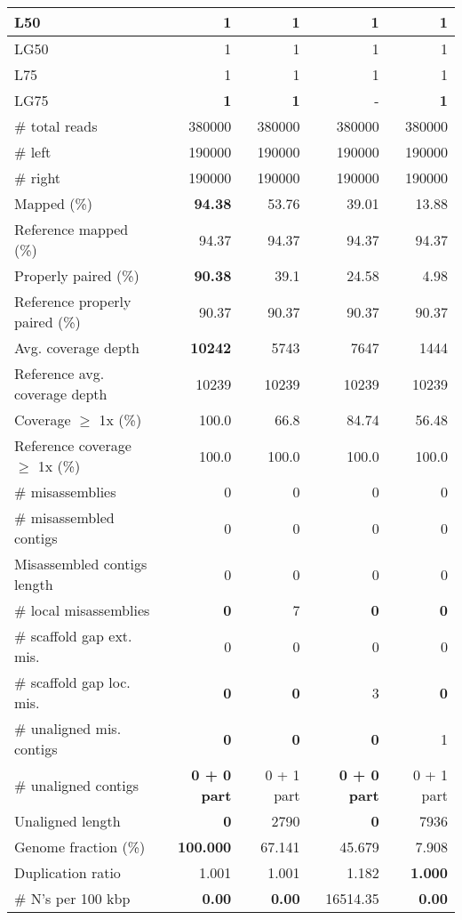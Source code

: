 \documentclass[12pt,a4paper]{article}
\begin{document}
\begin{table}[ht]
\begin{center}
\begin{tabular}{|l*{4}{|r}|}
L50 & 1 & 1 & 1 & 1 \\ \hline
LG50 & 1 & 1 & 1 & 1 \\ \hline
L75 & 1 & 1 & 1 & 1 \\ \hline
LG75 & {\bf 1} & {\bf 1} & - & {\bf 1} \\ \hline
\# total reads & 380000 & 380000 & 380000 & 380000 \\ \hline
\# left & 190000 & 190000 & 190000 & 190000 \\ \hline
\# right & 190000 & 190000 & 190000 & 190000 \\ \hline
Mapped (\%) & {\bf 94.38} & 53.76 & 39.01 & 13.88 \\ \hline
Reference mapped (\%) & 94.37 & 94.37 & 94.37 & 94.37 \\ \hline
Properly paired (\%) & {\bf 90.38} & 39.1 & 24.58 & 4.98 \\ \hline
Reference properly paired (\%) & 90.37 & 90.37 & 90.37 & 90.37 \\ \hline
Avg. coverage depth & {\bf 10242} & 5743 & 7647 & 1444 \\ \hline
Reference avg. coverage depth & 10239 & 10239 & 10239 & 10239 \\ \hline
Coverage $\geq$ 1x (\%) & 100.0 & 66.8 & 84.74 & 56.48 \\ \hline
Reference coverage $\geq$ 1x (\%) & 100.0 & 100.0 & 100.0 & 100.0 \\ \hline
\# misassemblies & 0 & 0 & 0 & 0 \\ \hline
\# misassembled contigs & 0 & 0 & 0 & 0 \\ \hline
Misassembled contigs length & 0 & 0 & 0 & 0 \\ \hline
\# local misassemblies & {\bf 0} & 7 & {\bf 0} & {\bf 0} \\ \hline
\# scaffold gap ext. mis. & 0 & 0 & 0 & 0 \\ \hline
\# scaffold gap loc. mis. & {\bf 0} & {\bf 0} & 3 & {\bf 0} \\ \hline
\# unaligned mis. contigs & {\bf 0} & {\bf 0} & {\bf 0} & 1 \\ \hline
\# unaligned contigs & {\bf 0 + 0 part} & 0 + 1 part & {\bf 0 + 0 part} & 0 + 1 part \\ \hline
Unaligned length & {\bf 0} & 2790 & {\bf 0} & 7936 \\ \hline
Genome fraction (\%) & {\bf 100.000} & 67.141 & 45.679 & 7.908 \\ \hline
Duplication ratio & 1.001 & 1.001 & 1.182 & {\bf 1.000} \\ \hline
\# N's per 100 kbp & {\bf 0.00} & {\bf 0.00} & 16514.35 & {\bf 0.00} \\ \hline

\end{tabular}
\end{center}
\end{table}
\end{document}

